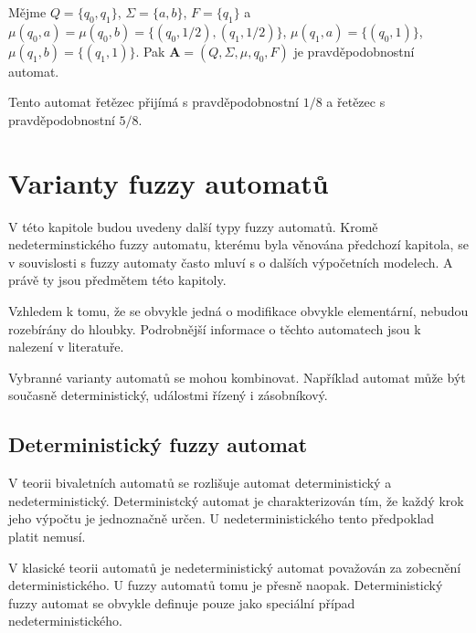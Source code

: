 \documentclass[a4paper,10pt]{article}
\begin{document}
\begin{example}
 Mějme $Q = \{ q_0, q_1 \}$, $\Sigma = \{ a, b \}$, $F = \{ q_1 \}$ a $\mu(q_0, a) = \mu(q_0, b) = \{ (q_0, 1/2), (q_1, 1/2) \}$, $\mu(q_1, a) = \{ (q_0, 1) \}$, $\mu(q_1, b) = \{ (q_1, 1) \}$. Pak $\mathbf{A} = (Q, \Sigma, \mu, q_0, F)$ je pravděpodobnostní automat.
 
 Tento automat řetězec  přijímá s pravděpodobnostní $1/8$ a řetězec  s pravděpodobnostní $5/8$.
\end{example}


\section{Varianty fuzzy automatů}
V této kapitole budou uvedeny další typy fuzzy automatů. Kromě nedeterminstického fuzzy automatu, kterému byla věnována předchozí kapitola, se v souvislosti s fuzzy automaty často mluví s o dalších výpočetních modelech. A právě ty jsou předmětem této kapitoly. 

Vzhledem k tomu, že se obvykle jedná o modifikace obvykle elementární, nebudou rozebírány do hloubky. Podrobnější informace o těchto automatech jsou k nalezení v literatuře.

\begin{note}
 Vybranné varianty automatů se mohou kombinovat. Například automat může být současně deterministický, událostmi řízený i zásobníkový.
\end{note}

\subsection{Deterministický fuzzy automat}
V teorii  bivaletních automatů se rozlišuje automat deterministický a nedeterministický. Deterministcký automat je charakterizován tím, že každý krok jeho výpočtu je jednoznačně určen. U nedeterministického tento předpoklad platit nemusí. 

V klasické teorii automatů je nedeterministický automat považován za zobecnění deterministického. U fuzzy automatů tomu je přesně naopak. Deterministický fuzzy automat se obvykle definuje pouze jako speciální případ nedeterministického.
\end{document}
